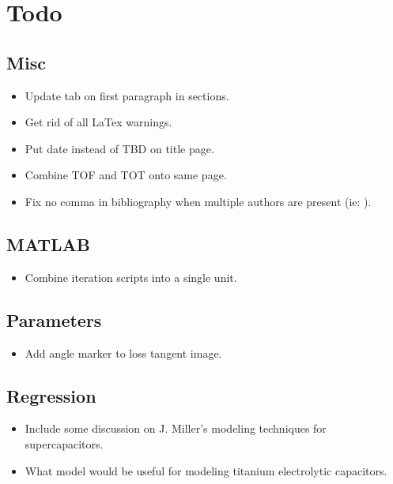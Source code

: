 \section{Todo}

\subsection{Misc}
\begin{itemize}
    \item Update tab on first paragraph in sections.
    \item Get rid of all LaTex warnings.
    \item Put date instead of TBD on title page.
    \item Combine TOF and TOT onto same page.
    \item Fix no comma in bibliography when multiple authors are present (ie: \cite{absCircuit}).
\end{itemize}

\subsection{MATLAB}
\begin{itemize}
    \item Combine iteration scripts into a single unit.
\end{itemize}

\subsection{Parameters}
\begin{itemize}
    \item Add angle marker to loss tangent image.
\end{itemize}

\subsection{Regression}
\begin{itemize}
    \item Include some discussion on J. Miller's modeling techniques for supercapacitors.
    \item What model would be useful for modeling titanium electrolytic capacitors.
\end{itemize}

